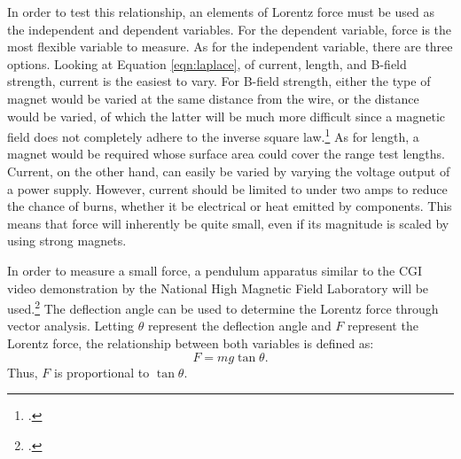In order to test this relationship, an elements of Lorentz force must be used as the independent and dependent variables.
For the dependent variable, force is the most flexible variable to measure.
As for the independent variable, there are three options.
Looking at Equation \eqref{eqn:laplace}, of current, length, and B-field strength, current is the easiest to vary.
For B-field strength, either the type of magnet would be varied at the same distance from the wire, or the distance would be varied, of which the latter will be much more difficult since a magnetic field does not completely adhere to the inverse square law.\footcite{wwdistance}
As for length, a magnet would be required whose surface area could cover the range test lengths.
Current, on the other hand, can easily be varied by varying the voltage output of a power supply.
However, current should be limited to under two amps to reduce the chance of burns, whether it be electrical or heat emitted by components.
This means that force will inherently be quite small, even if its magnitude is scaled by using strong magnets.

In order to measure a small force, a pendulum apparatus similar to the CGI video demonstration by the National High Magnetic Field Laboratory will be used.\footcite{nmllorentz}
The deflection angle can be used to determine the Lorentz force through vector analysis.
Letting $\theta$ represent the deflection angle and $F$ represent the Lorentz force, the relationship between both variables is defined as:
\begin{equation}
	F = mg \tan\theta \text{.} \label{eqn:experiment}
\end{equation}
Thus, $F$ is proportional to $\tan\theta$.
